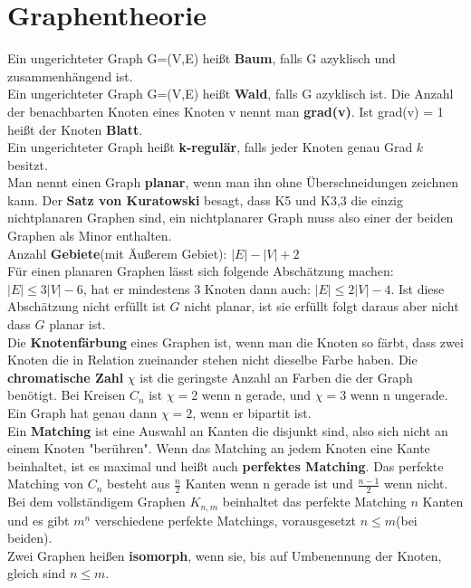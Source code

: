 \documentclass[11pt]{article}
\begin{document}
\section{Graphentheorie}
Ein ungerichteter Graph G=(V,E) hei{\ss}t {\bfseries Baum}, falls G azyklisch und zusammenh{\"a}ngend ist.\\
Ein ungerichteter Graph G=(V,E) hei{\ss}t {\bfseries Wald}, falls G azyklisch ist. Die Anzahl der benachbarten Knoten eines Knoten v nennt man {\bfseries grad(v)}. Ist grad(v) = 1 hei{\ss}t der Knoten {\bfseries Blatt}.  \\
Ein ungerichteter Graph hei{\ss}t {\bfseries k-regul{\"a}r}, falls jeder Knoten genau Grad $k$ besitzt.\\
Man nennt einen Graph {\bfseries planar}, wenn man ihn ohne {\"U}berschneidungen zeichnen kann. Der {\bfseries Satz von Kuratowski} besagt, dass K5 und K3,3 die einzig nichtplanaren Graphen sind, ein nichtplanarer Graph muss also einer der beiden Graphen als Minor enthalten.\\
Anzahl {\bfseries Gebiete}(mit {\"A}u{\ss}erem Gebiet): $\mathopen| E \mathclose| -  \mathopen| V \mathclose| + 2$\\
F{\"u}r einen planaren Graphen l{\"a}sst sich folgende Absch{\"a}tzung machen: $|E|\leq 3|V|-6$, hat er mindestens 3 Knoten dann auch: $|E|\leq 2|V|-4$. Ist diese Absch{\"a}tzung nicht erf{\"u}llt ist $G$ nicht planar, ist sie erf{\"u}llt folgt daraus aber nicht dass $G$ planar ist.\\
Die {\bfseries Knotenf{\"a}rbung} eines Graphen ist, wenn man die Knoten so f{\"a}rbt, dass zwei Knoten die in Relation zueinander stehen nicht dieselbe Farbe haben. Die {\bfseries chromatische Zahl} $\chi$ ist die geringste Anzahl an Farben die der Graph ben{\"o}tigt. Bei Kreisen $C_n$ ist $\chi = 2$ wenn n gerade, und $\chi = 3$ wenn n ungerade. Ein Graph hat genau dann $\chi = 2$, wenn er bipartit ist.\\ 
Ein {\bfseries Matching} ist eine Auswahl an Kanten die disjunkt sind, also sich nicht an einem Knoten "ber{\"u}hren". Wenn das Matching an jedem Knoten eine Kante beinhaltet, ist es maximal und hei{\ss}t auch {\bfseries perfektes Matching}. Das perfekte Matching von $C_n$ besteht aus $\frac{n}{2}$ Kanten wenn n gerade ist und $\frac{n-1}{2}$ wenn nicht. Bei dem vollst{\"a}ndigem Graphen $K_{n,m}$ beinhaltet das perfekte Matching  $n$ Kanten und es gibt $m^{\underline n}$ verschiedene perfekte Matchings, vorausgesetzt $n\leq m$(bei beiden).\\
Zwei Graphen hei{\ss}en {\bfseries isomorph}, wenn sie, bis auf Umbenennung der Knoten, gleich sind $n\leq m$.
\end{document}
